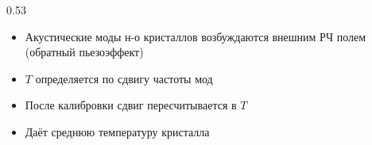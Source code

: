 \begin{frame}
\begin{columns}[t]
\begin{column}{0.53\textwidth}
			\vspace{-0.5cm}
			
			\begin{itemize}
				\setlength{\itemsep}{0.3em}
				\item Акустические моды н-о кристаллов возбуждаются внешним РЧ полем (обратный пьезоэффект)
				
				\item $T$ определяется по сдвигу частоты мод
				
				\item После калибровки сдвиг пересчитывается в $T$
				
				\item Даёт среднюю температуру кристалла\footnotemark
			\end{itemize}
		\end{column}
	\end{columns}	
\end{frame}


